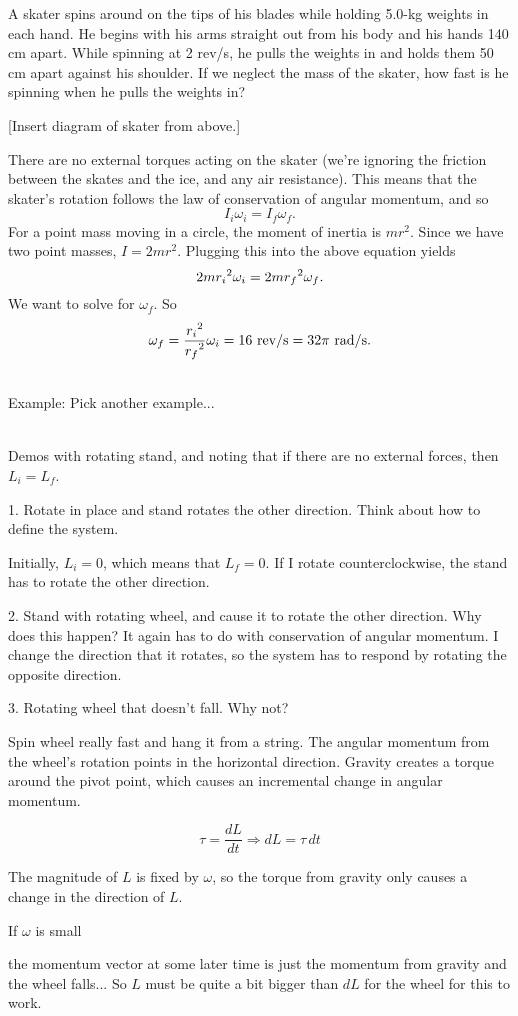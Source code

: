A skater spins around on the tips of his blades while holding 5.0-kg weights in each hand. He begins with his arms straight out from his body and his hands 140 cm apart. While spinning at 2 rev/s, he pulls the weights in and holds them 50 cm apart against his shoulder. If we neglect the mass of the skater, how fast is he spinning when he pulls the weights in?

[Insert diagram of skater from above.]
\vspace{5cm}

There are no external torques acting on the skater (we're ignoring the friction between the skates and the ice, and any air resistance). This means that the skater's rotation follows the law of conservation of angular momentum, and so
$$I_i\omega_i=I_f\omega_f.$$
For a point mass moving in a circle, the moment of inertia is $mr^2$. Since we have two point masses, $I=2mr^2$. Plugging this into the above equation yields
$$2mr_i\displaystyle^2\omega_i=2mr_f\displaystyle^2\omega_f.$$
We want to solve for $\omega_f$. So
$$\omega_f=\frac{r_i\displaystyle^2}{r_f\displaystyle^2}\omega_i=16\mbox{ rev/s}=32\pi\mbox{ rad/s}.$$

\hrulefill\\
Example: Pick another example...

\hrulefill\\
Demos with rotating stand, and noting that if there are no external forces, then $L_i=L_f$.

1. Rotate in place and stand rotates the other direction. Think about how to define the system.

Initially, $L_i=0$, which means that $L_f=0$. If I rotate counterclockwise, the stand has to rotate the other direction.
\vspace{5cm}

2. Stand with rotating wheel, and cause it to rotate the other direction. Why does this happen? It again has to do with conservation of angular momentum. I change the direction that it rotates, so the system has to respond by rotating the opposite direction.
\vspace{5cm}



3. Rotating wheel that doesn't fall. Why not?

Spin wheel really fast and hang it from a string. The angular momentum from the wheel's rotation points in the horizontal direction. Gravity creates a torque around the pivot point, which causes an incremental change in angular momentum.

$$\tau=\frac{dL}{dt}\Rightarrow dL=\tau\,dt$$

The magnitude of $L$ is fixed by $\omega$, so the torque from gravity only causes a change in the direction of $L$.
\vspace{5cm}

If $\omega$ is small
\vspace{5cm}

the momentum vector at some later time is just the momentum from gravity and the wheel falls... So $L$ must be quite a bit bigger than $dL$ for the wheel for this to work.


\clearpage
